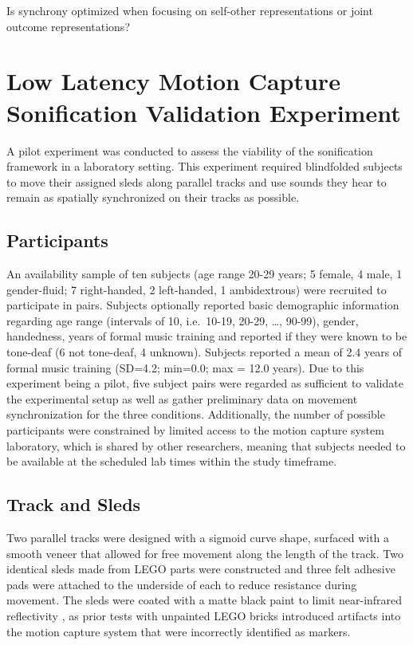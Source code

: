 \documentclass[10pt,a4paper,onecolumn]{article}
\begin{document}
Is synchrony optimized when focusing on self-other representations or joint outcome representations?

\hypertarget{low-latency-motion-capture-sonification-validation-experiment}{%
\section{Low Latency Motion Capture Sonification Validation Experiment}\label{low-latency-motion-capture-sonification-validation-experiment}}

A pilot experiment was conducted to assess the viability of the sonification framework in a laboratory setting. This experiment required blindfolded subjects to move their assigned sleds along parallel tracks and use sounds they hear to remain as spatially synchronized on their tracks as possible.

\hypertarget{participants}{%
\subsection{Participants}\label{participants}}

An availability sample of ten subjects (age range 20-29 years; 5 female, 4 male, 1 gender-fluid; 7 right-handed, 2 left-handed, 1 ambidextrous) were recruited to participate in pairs. Subjects optionally reported basic demographic information regarding age range (intervals of 10, i.e.~10-19, 20-29, \ldots, 90-99), gender, handedness, years of formal music training and reported if they were known to be tone-deaf (6 not tone-deaf, 4 unknown). Subjects reported a mean of 2.4 years of formal music training (SD=4.2; min=0.0; max = 12.0 years). Due to this experiment being a pilot, five subject pairs were regarded as sufficient to validate the experimental setup as well as gather preliminary data on movement synchronization for the three conditions. Additionally, the number of possible participants were constrained by limited access to the motion capture system laboratory, which is shared by other researchers, meaning that subjects needed to be available at the scheduled lab times within the study timeframe.

\hypertarget{track-and-sleds}{%
\subsection{Track and Sleds}\label{track-and-sleds}}

Two parallel tracks were designed with a sigmoid curve shape, surfaced with a smooth veneer that allowed for free movement along the length of the track. Two identical sleds made from LEGO parts were constructed and three felt adhesive pads were attached to the underside of each to reduce resistance during movement. The sleds were coated with a matte black paint to limit near-infrared reflectivity \autocite{benedictSurveyMaterialsCoatings2016}, as prior tests with unpainted LEGO bricks introduced artifacts into the motion capture system that were incorrectly identified as markers.
\end{document}

